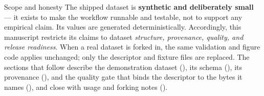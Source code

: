 \documentclass[
  ignorenonframetext,
]{beamer}
\begin{document}
\begin{frame}[allowframebreaks]{Scope and honesty}
\protect{}\label{scope-and-honesty}
The shipped dataset is \textbf{synthetic and deliberately small} --- it
exists to make the workflow runnable and testable, not to support any
empirical claim. Its values are generated deterministically.
Accordingly, this manuscript restricts its claims to dataset
\emph{structure, provenance, quality, and release readiness}. When a
real dataset is forked in, the same validation and figure code applies
unchanged; only the descriptor and fixture files are replaced. The
sections that follow describe the demonstration dataset
(), its schema (), its provenance
(), and the quality gate that binds the descriptor
to the bytes it names (), and close with usage and
forking notes ().
\end{frame}
\end{document}
